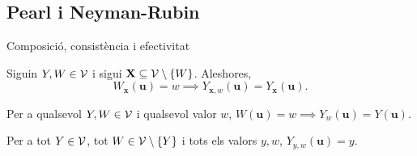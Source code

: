 \documentclass{bestbeamer}
\begin{document}
\subsection{Pearl i Neyman-Rubin}
\begin{frame}{Composició, consistència i efectivitat}
\begin{axiom}\label{prop:composicio}
Siguin $Y,W\in\mathcal{V}$ i sigui $\mathbf X\subseteq\mathcal{V}\setminus\{W\}$. Aleshores,
\begin{equation*}
W_{\mathbf x}(\mathbf u)=w \implies Y_{\mathbf x,w}(\mathbf u)=Y_{\mathbf x}(\mathbf u).
\end{equation*}
\end{axiom}
\begin{axiom}\label{cor:consistencia-galles-pearl}
Per a qualsevol $Y,W\in\mathcal{V}$ i qualsevol valor $w$, $W(\mathbf u)=w \implies Y_w(\mathbf u)=Y(\mathbf u)$.
\end{axiom}
\begin{axiom}\label{prop:efectivitat}
Per a tot $Y\in\mathcal{V}$, tot $W\in\mathcal{V}\setminus\{Y\}$ i tots els valors $y,w$, $Y_{y,w}(\mathbf u)=y$.
\end{axiom}
\end{frame}
\end{document}
